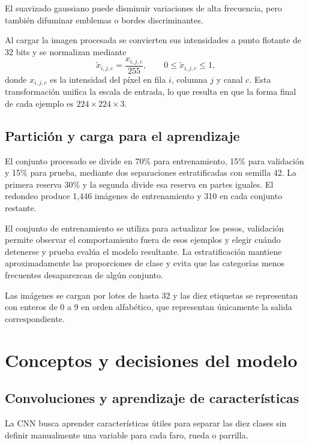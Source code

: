 \documentclass[conference]{IEEEtran}
\begin{document}
El suavizado gaussiano puede disminuir variaciones de alta frecuencia, pero también difuminar emblemas o bordes discriminantes.

Al cargar la imagen procesada se convierten sus intensidades a punto flotante de 32 bits y se normalizan mediante
\begin{equation}
\widetilde{x}_{i,j,c}=\frac{x_{i,j,c}}{255},\qquad 0\leq\widetilde{x}_{i,j,c}\leq1,
\label{eq:normalizacion}
\end{equation}
donde $x_{i,j,c}$ es la intensidad del píxel en fila $i$, columna $j$ y canal $c$. Esta transformación unifica la escala de entrada, lo que resulta en que la forma final de cada ejemplo es $224\times224\times3$.

\subsection{Partición y carga para el aprendizaje}

El conjunto procesado se divide en 70\% para entrenamiento, 15\% para validación y 15\% para prueba, mediante dos separaciones estratificadas con semilla 42. La primera reserva 30\% y la segunda divide esa reserva en partes iguales. El redondeo produce 1,446 imágenes de entrenamiento y 310 en cada conjunto restante.

El conjunto de entrenamiento se utiliza para actualizar los pesos, validación permite observar el comportamiento fuera de esos ejemplos y elegir cuándo detenerse y prueba evalúa el modelo resultante. La estratificación mantiene aproximadamente las proporciones de clase y evita que las categorías menos frecuentes desaparezcan de algún conjunto.

Las imágenes se cargan por lotes de hasta 32 y las diez etiquetas se representan con enteros de 0 a 9 en orden alfabético, que representan únicamente la salida correspondiente.

\FloatBarrier
\section{Conceptos y decisiones del modelo}

\subsection{Convoluciones y aprendizaje de características}

La CNN busca aprender características útiles para separar las diez clases sin definir manualmente una variable para cada faro, rueda o parrilla. 
\end{document}
